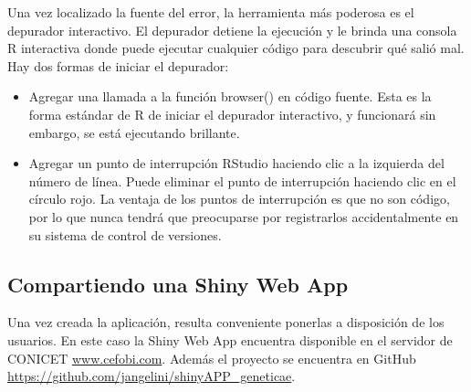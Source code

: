 Una vez localizado la fuente del error, la herramienta más poderosa es el depurador interactivo. El depurador detiene la ejecución y le brinda una consola R interactiva donde puede ejecutar cualquier código para descubrir qué salió mal. Hay dos formas de iniciar el depurador:

\begin{itemize}
\item Agregar una llamada a la función browser() en código fuente. Esta es la forma estándar de R de iniciar el depurador interactivo, y funcionará sin embargo, se está ejecutando brillante.
\item Agregar un punto de interrupción RStudio haciendo clic a la izquierda del número de línea. Puede eliminar el punto de interrupción haciendo clic en el círculo rojo. La ventaja de los puntos de interrupción es que no son código, por lo que nunca tendrá que preocuparse por registrarlos accidentalmente en su sistema de control de versiones.
\end{itemize}





\subsection{Compartiendo una Shiny Web App}

Una vez creada la aplicación, resulta conveniente ponerlas a disposición de los usuarios. En este caso la Shiny Web App encuentra disponible en el servidor de CONICET \url{www.cefobi.com}. Además el proyecto se encuentra en GitHub \url{https://github.com/jangelini/shinyAPP_geneticae}. 

